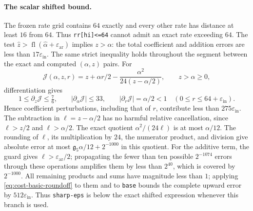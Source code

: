 \paragraph{The scalar shifted bound.}
The frozen rate grid contains $64$ exactly and every other rate has
distance at least $16$ from $64$.  Thus \texttt{rr[hi]<=64} cannot admit
an exact rate exceeding $64$.  The test
$\widehat z>\operatorname{fl}(\widehat\alpha+
\varepsilon_{\mathrm{ar}})$ implies $z>\alpha$: the total coefficient
and addition errors are less than $17\varepsilon_{\mathrm{in}}$.
The same strict inequality holds throughout the segment between the
exact and computed $(\alpha,z)$ pairs.  For
\[
 \mathcal J(\alpha,z,r)=z+\alpha r/2-
       \frac{\alpha^2}{24(z-\alpha/2)},\qquad z>\alpha\ge0,
\]
differentiation gives
\[
 1\le\partial_z\mathcal J\le\tfrac76,
 \qquad |\partial_\alpha\mathcal J|\le33,
 \qquad |\partial_r\mathcal J|=\alpha/2<1
 \quad(0\le r\le64+\varepsilon_{\mathrm{in}}).
\]
Hence coefficient perturbations, including that of $r$, contribute less
than $275\varepsilon_{\mathrm{in}}$.  The subtraction in
$\ell=z-\alpha/2$ has no harmful relative cancellation, since
$\ell>z/2$ and $\ell>\alpha/2$.
The exact quotient $\alpha^2/(24\ell)$ is at most $\alpha/12$.
The rounding of $\ell$, its multiplication by $24$, the numerator
product, and division give absolute error at most
$\mathfrak g_5\alpha/12+2^{-1000}$ in this quotient.
For the additive term, the guard gives $\ell>\varepsilon_{\mathrm{ar}}/2$;
propagating the fewer than ten possible $2^{-1074}$ errors through these
operations amplifies them by less than $2^{40}$, which is covered by
$2^{-1000}$.  All remaining products and sums have magnitude less
than $1$; applying \eqref{eq:cost-basic-roundoff} to them and to
\texttt{base} bounds the complete upward error by
$512\varepsilon_{\mathrm{in}}$.
Thus \texttt{sharp-eps} is below the exact shifted expression whenever
this branch is used.

